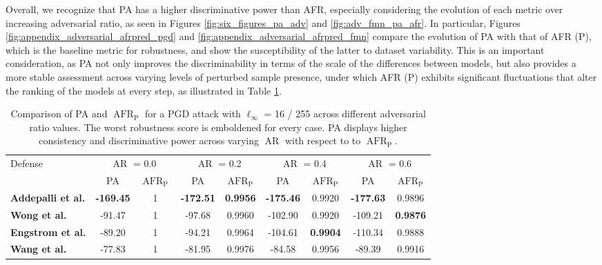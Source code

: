 Overall, we recognize that PA has a higher discriminative power than AFR, especially
considering the evolution of each metric over increasing adversarial ratio, as
seen in Figures \ref{fig:six_figures_pa_adv} and \ref{fig:adv_fmn_pa_afr}. 
In particular, Figures \ref{fig:appendix_adversarial_afrpred_pgd} and \ref{fig:appendix_adversarial_afrpred_fmn}
compare the evolution of PA with that of AFR (P), which is the baseline metric for robustness,
and show the susceptibility of the latter to dataset variability. This is an important
consideration, as PA not only improves the discriminability in terms of the scale of
the differences between models, but also provides a more stable assessment across varying
levels of perturbed sample presence, under which AFR (P) exhibits significant fluctuations
that alter the ranking of the models at every step, as illustrated in Table \ref{tab:pa_afrpred_comparison_table}. \\

\begin{table}[h]
    \centering
    \begin{tabular}{l|cc|cc|cc|cc}
    \multirow{2}{*}{Defense} & \multicolumn{2}{c|}{$\operatorname{AR}$ = 0.0} & \multicolumn{2}{c|}{$\operatorname{AR}$ = 0.2} & \multicolumn{2}{c|}{$\operatorname{AR}$ = 0.4} & \multicolumn{2}{c}{$\operatorname{AR}$ = 0.6} \\
    & PA & $\operatorname{AFR}_{\text{P}}$ & PA & $\operatorname{AFR}_{\text{P}}$ & PA & $\operatorname{AFR}_{\text{P}}$ & PA & $\operatorname{AFR}_{\text{P}}$ \\
    \midrule
    {\color{tab:purple} \textbf{Addepalli et al.}} & \textbf{-169.45} & 1 & \textbf{-172.51} & \textbf{0.9956} & \textbf{-175.46} & 0.9920 & \textbf{-177.63} & 0.9896 \\
    {\color{tab:red} \textbf{Wong et al.}} & -91.47 & 1 & -97.68 & 0.9960 & -102.90 & 0.9920 & -109.21 & \textbf{0.9876} \\
    {\color{tab:blue} \textbf{Engstrom et al.}} & -89.20 & 1 & -94.21 & 0.9964 & -104.61 & \textbf{0.9904} & -110.34 & 0.9888 \\
    {\color{tab:brown} \textbf{Wang et al.}} & -77.83 & 1 & -81.95 & 0.9976 & -84.58 & 0.9956 & -89.39 & 0.9916 \\
    \bottomrule
    \end{tabular}
    \caption{
        Comparison of PA and $\operatorname{AFR}_{\text{P}}$ for a 
        PGD attack with $\ell_\infty$ = 16 / 255 across different adversarial 
        ratio values. The worst robustness score is emboldened for every case.
        PA displays higher consistency and discriminative power 
        across varying $\operatorname{AR}$ with respect to to 
        $\operatorname{AFR}_{\text{P}}$.
    }
    \label{tab:pa_afrpred_comparison_table}
\end{table}


